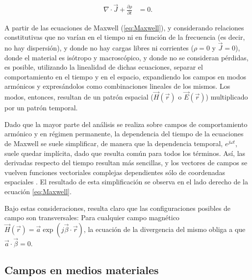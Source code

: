\begin{align}
	\label{eq:continuidad}
	\nabla \cdot \vec{J} + \frac{\partial \rho}{\partial t} &= 0.
\end{align}


A partir de las ecuaciones de Maxwell (\ref{eq:Maxwell}), y considerando relaciones constitutivas que no varían en el tiempo ni en función de la frecuencia (es decir, no hay dispersión), y donde no hay cargas libres ni corrientes ($\rho=0$ y $\vec{J}=0$), donde el material es isótropo y macroscópico, y donde no se consideran pérdidas, es posible, utilizando la linealidad de dichas ecuaciones, separar el comportamiento en el tiempo y en el espacio, expandiendo los campos en modos armónicos y expresándolos como combinaciones lineales de los mismos. Los modos, entonces, resultan de un patrón espacial ($\vec{H}(\vec{r})$ o $\vec{E}(\vec{r})$) multiplicado por un patrón temporal.

Dado que la mayor parte del análisis se realiza sobre campos de comportamiento armónico y en régimen permanente, la dependencia del tiempo de la ecuaciones de Maxwell se suele simplificar, de manera que la dependencia temporal, $e^{j \omega t}$, suele quedar implícita, dado que resulta común para todos los términos. Así, las derivadas respecto del tiempo resultan más sencillas, y los vectores de campos se vuelven funciones vectoriales complejas dependientes sólo de coordenadas espaciales \cite{Collin:GuidedWaves}. El resultado de esta simplificación se observa en el lado derecho de la ecuación \ref{eq:Maxwell}.

Bajo estas consideraciones, resulta claro que las configuraciones posibles de campo son transversales: Para cualquier campo magnético $\vec{H}(\vec{r}) = \vec{a} \exp(j \vec{\beta} \cdot \vec{r})$, la ecuación de la divergencia del mismo obliga a que $\vec{a} \cdot \vec{\beta} = 0$.

\subsection{Campos en medios materiales}
\label{subsec_campos_en_dielectricos}

